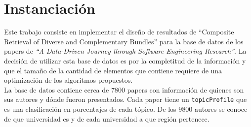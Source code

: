 \section{Instanciación}
Este trabajo consiste en implementar el diseño de resultados de ``Composite Retrieval of Diverse and Complementary Bundles'' 
para la base de datos de los papers de \textit{\textquotedblleft A Data-Driven Journey through Software Engineering Research\textquotedblright}\cite{dataDrive}.
La decisión de utilizar esta base de datos es por la completitud de la información y que el tamaño de la cantidad de elementos
que contiene requiere de una optimización de los algoritmos propuestos.\\

La base de datos contiene cerca de $7800$ papers con información de quienes son sus autores y dónde fueron presentados. 
Cada paper tiene un \texttt{topicProfile} que es una clasificación en porcentajes de cada tópico. De los $9800$ autores se conoce de que universidad 
es y de cada universidad a que región pertenece.

